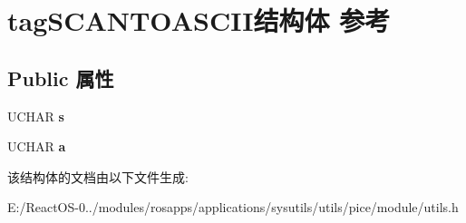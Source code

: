 \hypertarget{structtag_s_c_a_n_t_o_a_s_c_i_i}{}\section{tag\+S\+C\+A\+N\+T\+O\+A\+S\+C\+I\+I结构体 参考}
\label{structtag_s_c_a_n_t_o_a_s_c_i_i}
\subsection*{Public 属性}
\begin{DoxyCompactItemize}
\item 
\mbox{\label{structtag_s_c_a_n_t_o_a_s_c_i_i_a7ff0a68df7115f9c1af0b68b145f72fa}} 
U\+C\+H\+AR {\bfseries s}
\item 
\mbox{\label{structtag_s_c_a_n_t_o_a_s_c_i_i_afd72bef631c720cfa41c7514df601b61}} 
U\+C\+H\+AR {\bfseries a}
\end{DoxyCompactItemize}


该结构体的文档由以下文件生成\+:\begin{DoxyCompactItemize}
\item 
E\+:/\+React\+O\+S-\/0../modules/rosapps/applications/sysutils/utils/pice/module/utils.\+h\end{DoxyCompactItemize}
